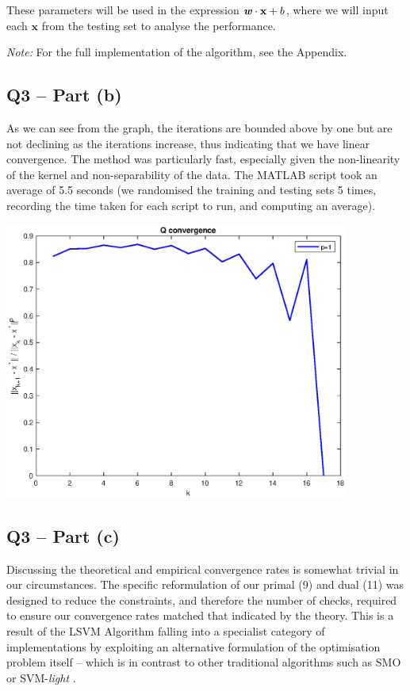 \documentclass{article}
\begin{document}
These parameters will be used in the expression $\textbf{\textit{w}} \cdot \textbf{x} + b$, where we will input each $\textbf{x}$ from the testing set to analyse the performance. \par

\textit{Note:} For the full implementation of the algorithm, see the Appendix. 

\subsection*{Q3 – Part (b)}
As we can see from the graph, the iterations are bounded above by one but are not declining as the iterations increase, thus indicating that we have linear convergence. The method was particularly fast, especially given the non-linearity of the kernel and non-separability of the data. The MATLAB script took an average of 5.5 seconds (we randomised the training and testing sets 5 times, recording the time taken for each script to run, and computing an average).

\begin{center}
    \includegraphics[width=0.85\textwidth]{Convergence.eps}
\end{center} \par


\subsection*{Q3 – Part (c)}
Discussing the theoretical and empirical convergence rates is somewhat trivial in our circumstances. The specific reformulation of our primal (9) and dual (11) was designed to reduce the constraints, and therefore the number of checks, required to ensure our convergence rates matched that indicated by the theory. This is a result of the LSVM Algorithm falling into a specialist category of implementations by exploiting an alternative formulation of the optimisation problem itself \cite{cherkassky2007learning} – which is in contrast to other traditional algorithms such as SMO \cite{platt1998sequential} or SVM-\textit{light} \cite{joachims1999svmlight}. \par
\end{document}
